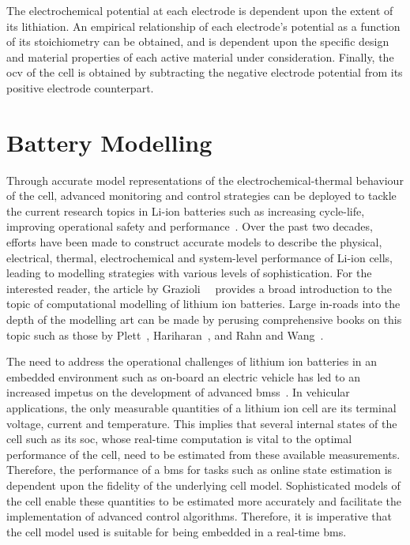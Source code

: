 The electrochemical potential at each electrode  is dependent upon the extent of
its  lithiation. An  empirical  relationship of  each  electrode's potential  as
a  function  of  its  stoichiometry  can be  obtained,  and  is  dependent  upon
the  specific design  and  material  properties of  each  active material  under
consideration. Finally, the \gls{ocv} of the cell is obtained by subtracting the
negative electrode potential from its positive electrode counterpart.


\section{Battery Modelling}

Through accurate model representations  of the electrochemical-thermal behaviour
of  the cell,  advanced monitoring  and control  strategies can  be deployed  to
tackle  the current  research  topics  in Li-ion  batteries  such as  increasing
cycle-life,  improving  operational   safety  and  performance~\cite{Plett2015}.
Over  the  past two  decades,  efforts  have  been  made to  construct  accurate
models  to  describe  the  physical, electrical,  thermal,  electrochemical  and
system-level performance of  Li-ion cells, leading to  modelling strategies with
various  levels of  sophistication. For  the interested  reader, the  article by
Grazioli~\etal~\cite{Grazioli2016a} provides  a broad introduction to  the topic
of computational  modelling of  lithium ion batteries.  Large in-roads  into the
depth of the modelling  art can be made by perusing  comprehensive books on this
topic such  as those by  Plett~\cite{Plett2015}, Hariharan~\cite{Hariharan2017},
and Rahn and Wang~\cite{Rahn2013}.

The  need  to  address  the  operational challenges  of  lithium  ion  batteries
in   an   embedded   environment   such  as   on-board   an   electric   vehicle
has   led   to  an   increased   impetus   on   the  development   of   advanced
\glspl{bms}~\cite{Bergveld2002}. In vehicular  applications, the only measurable
quantities  of  a  lithium  ion  cell are  its  terminal  voltage,  current  and
temperature. This implies  that several internal states of the  cell such as its
\gls{soc}, whose  real-time computation is  vital to the optimal  performance of
the cell, need to be estimated from these available measurements. Therefore, the
performance  of  a \gls{bms}  for  tasks  such  as  online state  estimation  is
dependent upon the  fidelity of the underlying cell  model. Sophisticated models
of  the  cell enable  these  quantities  to  be  estimated more  accurately  and
facilitate the implementation  of advanced control algorithms.  Therefore, it is
imperative  that  the cell  model  used  is suitable  for  being  embedded in  a
real-time \gls{bms}.

